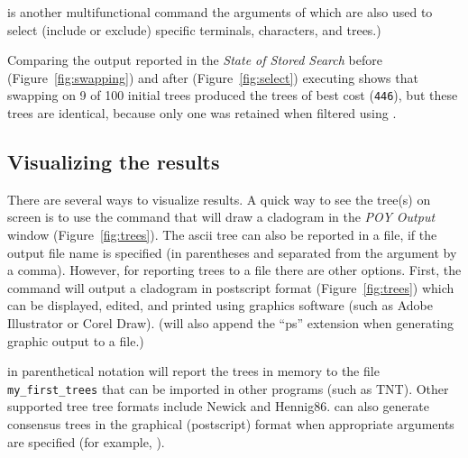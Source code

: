  is another multifunctional command the arguments of which are also used to select (include or exclude) specific terminals, characters, and trees.)

Comparing the output reported in the \emph{State of Stored Search} before (Figure~\ref{fig:swapping}) and after (Figure~\ref{fig:select}) executing  shows that swapping on 9 of 100 initial trees produced the trees of best cost (\texttt{446}), but these trees are identical, because only one was retained when filtered using .

\subsection{Visualizing the results}

There are several ways to visualize results. A quick way to see the tree(s) on screen is to use the command  that will draw a cladogram in the \emph{POY Output} window (Figure~\ref{fig:trees}). The ascii tree can also be reported in a file, if the output file name is specified (in parentheses and separated from the argument  by a comma). However, for reporting trees to a file there are other options. First, the command  will output a cladogram in postscript format (Figure~\ref{fig:trees}) which can be displayed, edited, and printed using graphics software (such as Adobe Illustrator or Corel Draw). (\poy will also append the ``ps'' extension when generating graphic output to a file.)

 in parenthetical notation will report the trees in memory to the file \texttt{my\_first\_trees} that can be imported in other programs (such as TNT). Other supported tree tree formats include Newick and Hennig86.  can also generate consensus trees in the graphical (postscript) format when appropriate arguments are specified (for example, ).


